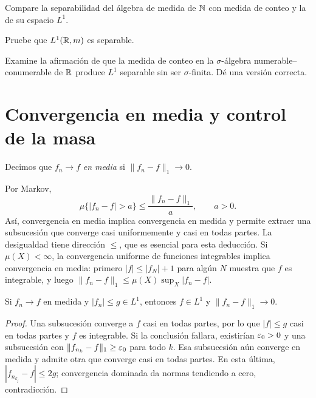 \begin{ejercicio}\label{ej:v2-l16-4}
Compare la separabilidad del álgebra de medida de $\mathbb N$ con medida de conteo y la de su espacio $L^1$.
\end{ejercicio}

\begin{ejercicio}\label{ej:v2-l16-5}
Pruebe que $L^1(\mathbb R,m)$ es separable.
\end{ejercicio}

\begin{ejercicio}\label{ej:v2-l16-6}
Examine la afirmación de que la medida de conteo en la $\sigma$-álgebra numerable--conumerable de $\mathbb R$ produce $L^1$ separable sin ser $\sigma$-finita. Dé una versión correcta.
\end{ejercicio}


\section{Convergencia en media y control de la masa}\label{lectura:v2-17}
\begin{definicion}
Decimos que $f_n\to f$ \emph{en media} si $\|f_n-f\|_1\to0$.
\end{definicion}
Por Markov,
\[\mu\{|f_n-f|>a\}\le\frac{\|f_n-f\|_1}{a},\qquad a>0.
\]
Así, convergencia en media implica convergencia en medida y permite extraer una subsucesión que converge casi uniformemente y casi en todas partes. La desigualdad tiene dirección $\le$, que es esencial para esta deducción. Si $\mu(X)<\infty$, la convergencia uniforme de funciones integrables implica convergencia en media: primero $|f|\le|f_N|+1$ para algún $N$ muestra que $f$ es integrable, y luego $\|f_n-f\|_1\le\mu(X)\sup_X|f_n-f|$.

\begin{teorema}\label{teo:v2-dominada-medida}
Si $f_n\to f$ en medida y $|f_n|\le g\in L^1$, entonces $f\in L^1$ y $\|f_n-f\|_1\to0$.
\end{teorema}
\begin{proof}
Una subsucesión converge a $f$ casi en todas partes, por lo que $|f|\le g$ casi en todas partes y $f$ es integrable. Si la conclusión fallara, existirían $\varepsilon_0>0$ y una subsucesión con $\|f_{n_k}-f\|_1\ge\varepsilon_0$ para todo $k$. Esa subsucesión aún converge en medida y admite otra que converge casi en todas partes. En esta última, $|f_{n_{k_j}}-f|\le2g$; convergencia dominada da normas tendiendo a cero, contradicción.
\end{proof}

